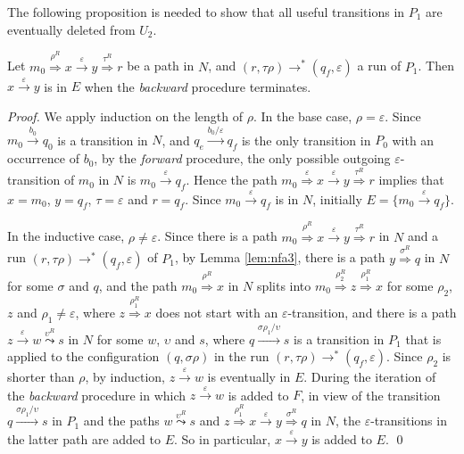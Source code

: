 \documentclass{llncs}
\newcommand{\eps}{\ensuremath{\varepsilon}}
\begin{document}
The following proposition is needed to show that all useful transitions in $P_1$ are eventually deleted from $U_2$.

\begin{proposition}
\label{prop:nfa3}
Let $m_0\stackrel{\rho^R}{\Rightarrow}x\stackrel{\eps}{\rightarrow}y\stackrel{\tau^R}{\Rightarrow}r$ be a path in $N$,
and $(r,\tau\rho)\rightarrow^*(q_f,\eps)$ a run of $P_1$. Then $x\stackrel{\eps}{\rightarrow}y$ is in $E$ when the
{\em backward} procedure terminates.
\end{proposition}

\begin{proof}
We apply induction on the length of $\rho$.
In the base case, $\rho=\eps$. Since $m_0\stackrel{b_0}{\rightarrow}q_0$ is a transition in $N$, and $q_e\stackrel{b_0/\eps}{\rightarrow}q_f$
is the only transition in $P_0$ with an occurrence of $b_0$, by the {\em forward} procedure, the only possible outgoing $\eps$-transition of
$m_0$ in $N$ is $m_0\stackrel{\eps}{\rightarrow}q_f$. Hence the path $m_0\stackrel{\eps}{\Rightarrow}x\stackrel{\eps}{\rightarrow}y\stackrel{\tau^R}{\Rightarrow}r$
implies that $x=m_0$, $y=q_f$, $\tau=\eps$ and $r=q_f$.
Since $m_0\stackrel{\eps}{\rightarrow}q_f$ is in $N$, initially $E=\{m_0\stackrel{\eps}{\rightarrow}q_f\}$.

In the inductive case, $\rho\neq\eps$. Since there is a path $m_0\stackrel{\rho^R}{\Rightarrow}x\stackrel{\eps}{\rightarrow}y\stackrel{\tau^R}{\Rightarrow}r$ in $N$
and a run $(r,\tau\rho)\rightarrow^*(q_f,\eps)$ of $P_1$, by Lemma \ref{lem:nfa3},
there is a path $y\stackrel{\sigma^R}{\Rightarrow}q$ in $N$ for some $\sigma$ and $q$, and
the path $m_0\stackrel{\rho^R}{\Rightarrow}x$ in $N$ splits into $m_0\stackrel{\rho_2^R}{\Rightarrow}z\stackrel{\rho_1^R}{\Rightarrow}x$
for some $\rho_2$, $z$ and $\rho_1\neq\eps$,
where $z\stackrel{\rho_1^R}{\Rightarrow}x$ does not start with an $\eps$-transition, and
there is a path $z\stackrel{\eps}{\rightarrow}w\stackrel{\upsilon^R}{\leadsto}s$ in $N$ for some $w$, $\upsilon$ and $s$,
where $q\stackrel{\sigma\rho_1/\upsilon}{\rightarrow}s$ is a transition in $P_1$
that is applied to the configuration $(q,\sigma\rho)$ in the run $(r,\tau\rho)\rightarrow^*(q_f,\eps)$.
Since $\rho_2$ is shorter than $\rho$, by induction, $z\stackrel{\eps}{\rightarrow}w$ is eventually in $E$.
During the iteration of the {\em backward} procedure in which $z\stackrel{\eps}{\rightarrow}w$ is added to $F$,
in view of the transition $q\stackrel{\sigma\rho_1/\upsilon}{\rightarrow}s$ in $P_1$ and the paths $w\stackrel{\upsilon^R}{\leadsto}s$ and
$z\stackrel{\rho_1^R}{\Rightarrow}x\stackrel{\eps}{\rightarrow}y\stackrel{\sigma^R}{\Rightarrow}q$ in $N$, the $\eps$-transitions in
the latter path are added to $E$. So in particular, $x\stackrel{\eps}{\rightarrow}y$ is added to $E$.
\qed
\end{proof}
\end{document}
